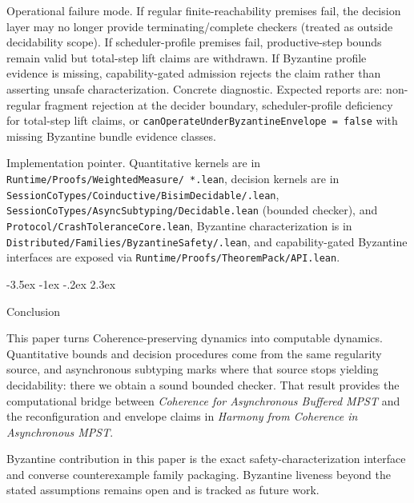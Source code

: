 \documentclass[a4paper,10pt,twocolumn,english]{article}
\makeatletter
\renewcommand{\section}{\@startsection{section}{1}{\z@}%
  {-3.5ex \@plus -1ex \@minus -.2ex}%
  {2.3ex}%
  {\raggedright\normalfont\large\bfseries}}
\numberwithin{equation}{section}
\theoremstyle{paperdef}
\theoremstyle{paperplain}
\theoremstyle{paperdef}
\theoremstyle{paperremark}
\makeatother
\begin{document}
Operational failure mode. If regular finite-reachability premises fail, the
decision layer may no longer provide terminating/complete checkers (treated as
outside decidability scope). If scheduler-profile premises fail, productive-step
bounds remain valid but total-step lift claims are withdrawn. If Byzantine
profile evidence is missing, capability-gated admission rejects the claim rather
than asserting unsafe characterization.
Concrete diagnostic. Expected reports are: non-regular fragment rejection at
the decider boundary, scheduler-profile deficiency for total-step lift claims,
or \texttt{canOperateUnderByzantineEnvelope = false} with missing Byzantine
bundle evidence classes.

Implementation pointer. Quantitative kernels are in
\texttt{Runtime/\allowbreak Proofs/\allowbreak WeightedMeasure/\allowbreak
	*.lean}, decision kernels are in
\texttt{SessionCoTypes/\allowbreak Coinductive/\allowbreak BisimDecidable/\allowbreak *.lean},
\texttt{SessionCoTypes/\allowbreak AsyncSubtyping/\allowbreak Decidable.lean} (bounded checker), and
\texttt{Protocol/\allowbreak CrashToleranceCore.lean}, Byzantine characterization is in
\texttt{Distributed/\allowbreak Families/\allowbreak ByzantineSafety/\allowbreak *.lean}, and
capability-gated Byzantine interfaces are exposed via
\texttt{Runtime/\allowbreak Proofs/\allowbreak TheoremPack/\allowbreak API.lean}.

\section{Conclusion}
\label{sec:conclusion}

This paper turns Coherence-preserving dynamics into computable dynamics. Quantitative bounds and decision procedures come from the same regularity source, and asynchronous subtyping marks where that source stops yielding decidability: there we obtain a sound bounded checker. That result provides the computational bridge between \emph{Coherence for Asynchronous Buffered MPST} and the reconfiguration and envelope claims in \emph{Harmony from Coherence in Asynchronous MPST}.

Byzantine contribution in this paper is the exact safety-characterization interface and converse counterexample family packaging. Byzantine liveness beyond the stated assumptions remains open and is tracked as future work.
\end{document}
